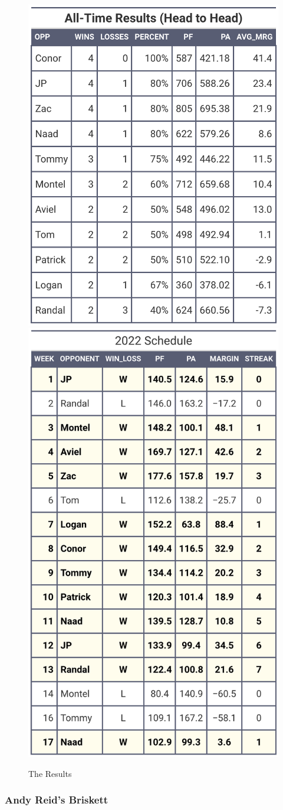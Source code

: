 \documentclass[
]{article}
\begin{document}
\begin{figure}
\includegraphics[width=0.5\linewidth,height=0.5\textheight]{output/headtohead/Hosta_head_to_head} \includegraphics[width=0.5\linewidth,height=0.5\textheight]{output/py_schedule/season_results_Hosta} \caption{The Results}\label{fig:unnamed-chunk-16}
\end{figure}

\hypertarget{andy-reids-briskett}{%
\subsubsection{Andy Reid's Briskett}\label{andy-reids-briskett}}
\end{document}
